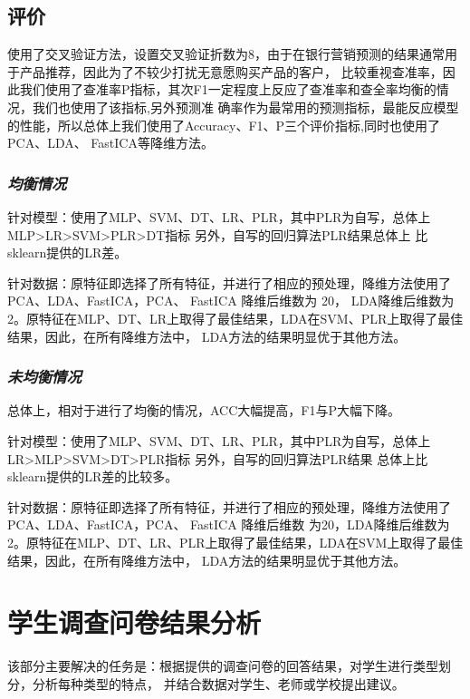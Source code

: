 \documentclass{acm_proc_article-sp}
\begin{document}
\subsection{\textsf{评价}}

使用了交叉验证方法，设置交叉验证折数为8，由于在银行营销预测的结果通常用于产品推荐，因此为了不较少打扰无意愿购买产品的客户，
比较重视查准率，因此我们使用了查准率P指标，其次F1一定程度上反应了查准率和查全率均衡的情况，我们也使用了该指标,另外预测准
确率作为最常用的预测指标，最能反应模型的性能，所以总体上我们使用了Accuracy、F1、P三个评价指标,同时也使用了PCA、LDA、
FastICA等降维方法。

\subsubsection{\textsl{均衡情况}}

针对模型：使用了MLP、SVM、DT、LR、PLR，其中PLR为自写，总体上MLP>LR>SVM>PLR>DT指标 另外，自写的回归算法PLR结果总体上
比sklearn提供的LR差。

针对数据：原特征即选择了所有特征，并进行了相应的预处理，降维方法使用了PCA、LDA、FastICA，PCA、 FastICA 降维后维数为
20， LDA降维后维数为2。原特征在MLP、DT、LR上取得了最佳结果，LDA在SVM、PLR上取得了最佳结果，因此，在所有降维方法中，
LDA方法的结果明显优于其他方法。

\subsubsection{\textsl{未均衡情况}}

总体上，相对于进行了均衡的情况，ACC大幅提高，F1与P大幅下降。

针对模型：使用了MLP、SVM、DT、LR、PLR，其中PLR为自写，总体上LR>MLP>SVM>DT>PLR指标 另外，自写的回归算法PLR结果
总体上比sklearn提供的LR差的比较多。

针对数据：原特征即选择了所有特征，并进行了相应的预处理，降维方法使用了PCA、LDA、FastICA，PCA、 FastICA 降维后维数
为20，LDA降维后维数为2。原特征在MLP、DT、LR、PLR上取得了最佳结果，LDA在SVM上取得了最佳结果，因此，在所有降维方法中，
LDA方法的结果明显优于其他方法。

\section{\textsf{学生调查问卷结果分析}}

该部分主要解决的任务是：根据提供的调查问卷的回答结果，对学生进行类型划分，分析每种类型的特点，
并结合数据对学生、老师或学校提出建议。
\end{document}
